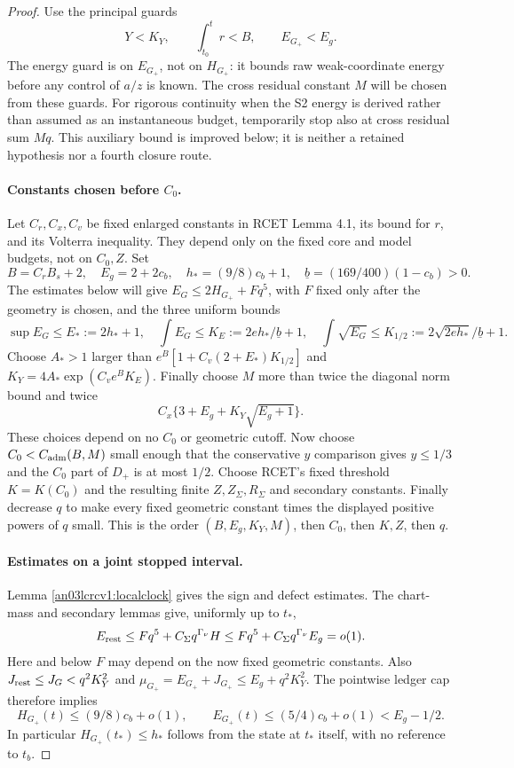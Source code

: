 \documentclass[11pt]{article}
\theoremstyle{remark}\newtheorem{remark}[theorem]{Remark}
\newcommand{\Gp}{G_+}
\begin{document}
\begin{proof}
Use the principal guards
\begin{equation}\label{an03lcrcv1:guards}
 Y<K_Y,\qquad \int_{t_0}^t r<B,\qquad E_{\Gp}<E_g.
\end{equation}
The energy guard is on $E_{\Gp}$, not on $H_{\Gp}$: it bounds
raw weak-coordinate energy before any control of $a/z$ is known.
The cross residual constant $M$ will be chosen from these guards.
For rigorous continuity when the S2 energy is derived rather than
assumed as an instantaneous budget, temporarily stop also at cross
residual sum $Mq$. This auxiliary bound is improved below; it is
neither a retained hypothesis nor a fourth closure route.

\paragraph{Constants chosen before $C_0$.}
Let $C_r,C_x,C_v$ be fixed enlarged constants in RCET Lemma 4.1,
its bound for $r$, and its Volterra inequality. They depend only on
the fixed core and model budgets, not on $C_0,Z$.
Set
\[
 B=C_rB_s+2,\quad E_g=2+2c_b,\quad
 h_*=(9/8)c_b+1,\quad \underline b=(169/400)(1-c_b)>0.
\]
The estimates below will give $E_G\le2H_{\Gp}+Fq^5$, with $F$
fixed only after the geometry is chosen, and the three uniform bounds
\begin{equation}\label{an03lcrcv1:integralconstants}
 \sup E_G\le E_*:=2h_*+1,\quad
 \int E_G\le K_E:=2eh_*/\underline b+1,\quad
 \int\sqrt{E_G}\le K_{1/2}:=
 2\sqrt{2eh_*}/\underline b+1.
\end{equation}
Choose $A_*>1$ larger than
$e^B[1+C_v(2+E_*)K_{1/2}]$ and
$K_Y=4A_*\exp(C_ve^BK_E)$.
Finally choose $M$ more than twice the diagonal norm bound and twice
\[
 C_x\{3+E_g+K_Y\sqrt{E_g+1}\}.
\]
These choices depend on no $C_0$ or geometric cutoff. Now choose
$C_0<C_{\rm adm}(B,M)$ small enough that the conservative
$y$ comparison gives $y\le1/3$ and the $C_0$ part of $D_+$ is
at most $1/2$. Choose RCET's fixed threshold $K=K(C_0)$ and
the resulting finite $Z,Z_\Sigma,R_\Sigma$ and secondary constants.
Finally decrease $q$ to make every fixed geometric constant times
the displayed positive powers of $q$ small. This is the order
$(B,E_g,K_Y,M)$, then $C_0$, then $K,Z$, then $q$.

\paragraph{Estimates on a joint stopped interval.}
Lemma \ref{an03lcrcv1:localclock} gives the sign and defect estimates.
The chart-mass and secondary lemmas give, uniformly up to $t_*$,
\begin{equation}\label{an03lcrcv1:restsmall}
 E_{\rm rest}\le Fq^5+C_\Sigma q^{\Gamma_\nu}H
 \le Fq^5+C_\Sigma q^{\Gamma_\nu}E_g=o(1).
\end{equation}
Here and below $F$ may depend on the now fixed geometric constants.
Also $J_{\rm rest}\le J_G<q^2K_Y^2$ and
$\mu_{\Gp}=E_{\Gp}+J_{\Gp}\le E_g+q^2K_Y^2$.
The pointwise ledger cap therefore implies
\[
 H_{\Gp}(t)\le(9/8)c_b+o(1),\qquad
 E_{\Gp}(t)\le(5/4)c_b+o(1)<E_g-1/2.
\]
In particular $H_{\Gp}(t_*)\le h_*$ follows from the state at
$t_*$ itself, with no reference to $t_b$.


\end{proof}
\end{document}
